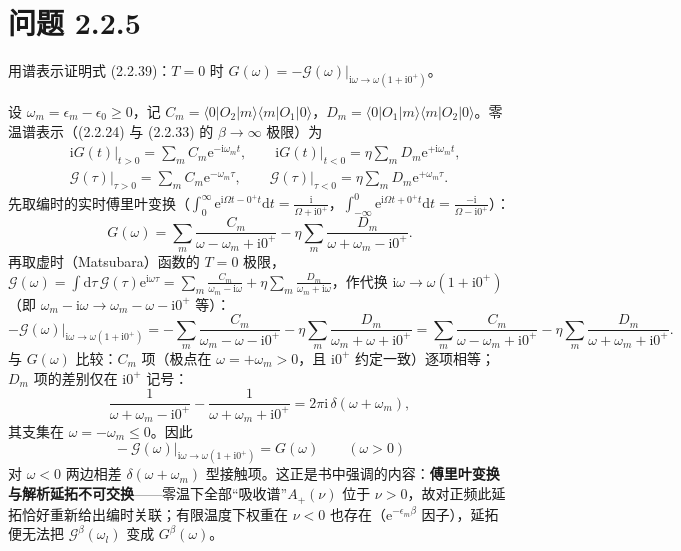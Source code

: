 \section*{问题 2.2.5}
\begin{problem}
用谱表示证明式 (2.2.39)：$T=0$ 时 $G(\omega)=-\mathcal G(\omega)\big|_{\mathrm{i}\omega\to\omega(1+\mathrm{i}0^+)}$。
\end{problem}
\solution
设 $\omega_m=\epsilon_m-\epsilon_0\ge0$，记 $C_m=\langle0|O_2|m\rangle\langle m|O_1|0\rangle$，$D_m=\langle0|O_1|m\rangle\langle m|O_2|0\rangle$。零温谱表示（(2.2.24) 与 (2.2.33) 的 $\beta\to\infty$ 极限）为
\begin{align*}
&\mathrm{i}G(t)\big|_{t>0}=\sum_mC_m\mathrm{e}^{-\mathrm{i}\omega_mt},\qquad
\mathrm{i}G(t)\big|_{t<0}=\eta\sum_mD_m\mathrm{e}^{+\mathrm{i}\omega_mt},\\
&\mathcal G(\tau)\big|_{\tau>0}=\sum_mC_m\mathrm{e}^{-\omega_m\tau},\qquad
\mathcal G(\tau)\big|_{\tau<0}=\eta\sum_mD_m\mathrm{e}^{+\omega_m\tau}.
\end{align*}
先取编时的实时傅里叶变换（$\int_0^\infty\mathrm{e}^{\mathrm{i}\varOmega t-0^+t}\mathrm{d}t=\frac{\mathrm{i}}{\varOmega+\mathrm{i}0^+}$，$\int_{-\infty}^0\mathrm{e}^{\mathrm{i}\varOmega t+0^+t}\mathrm{d}t=\frac{-\mathrm{i}}{\varOmega-\mathrm{i}0^+}$）：
\begin{equation*}
G(\omega)=\sum_m\frac{C_m}{\omega-\omega_m+\mathrm{i}0^+}
-\eta\sum_m\frac{D_m}{\omega+\omega_m-\mathrm{i}0^+}.
\end{equation*}
再取虚时（Matsubara）函数的 $T=0$ 极限，$\mathcal G(\omega)=\int\mathrm{d}\tau\,\mathcal G(\tau)\mathrm{e}^{\mathrm{i}\omega\tau}=\sum_m\frac{C_m}{\omega_m-\mathrm{i}\omega}+\eta\sum_m\frac{D_m}{\omega_m+\mathrm{i}\omega}$，作代换 $\mathrm{i}\omega\to\omega(1+\mathrm{i}0^+)$（即 $\omega_m-\mathrm{i}\omega\to\omega_m-\omega-\mathrm{i}0^+$ 等）：
\begin{equation*}
-\mathcal G(\omega)\big|_{\mathrm{i}\omega\to\omega(1+\mathrm{i}0^+)}
=-\sum_m\frac{C_m}{\omega_m-\omega-\mathrm{i}0^+}
-\eta\sum_m\frac{D_m}{\omega_m+\omega+\mathrm{i}0^+}
=\sum_m\frac{C_m}{\omega-\omega_m+\mathrm{i}0^+}
-\eta\sum_m\frac{D_m}{\omega+\omega_m+\mathrm{i}0^+}.
\end{equation*}
与 $G(\omega)$ 比较：$C_m$ 项（极点在 $\omega=+\omega_m>0$，且 $\mathrm{i}0^+$ 约定一致）逐项相等；$D_m$ 项的差别仅在 $\mathrm{i}0^+$ 记号：
\begin{equation*}
\frac{1}{\omega+\omega_m-\mathrm{i}0^+}-\frac{1}{\omega+\omega_m+\mathrm{i}0^+}=2\pi\mathrm{i}\,\delta(\omega+\omega_m),
\end{equation*}
其支集在 $\omega=-\omega_m\le0$。因此
\begin{equation*}
\boxed{\;-\mathcal G(\omega)\big|_{\mathrm{i}\omega\to\omega(1+\mathrm{i}0^+)}=G(\omega)
\qquad(\omega>0)\;}
\end{equation*}
对 $\omega<0$ 两边相差 $\delta(\omega+\omega_m)$ 型接触项。这正是书中强调的内容：\textbf{傅里叶变换与解析延拓不可交换}——零温下全部“吸收谱”$A_+(\nu)$ 位于 $\nu>0$，故对正频此延拓恰好重新给出编时关联；有限温度下权重在 $\nu<0$ 也存在（$\mathrm{e}^{-\epsilon_m\beta}$ 因子），延拓便无法把 $\mathcal G^\beta(\omega_l)$ 变成 $G^\beta(\omega)$。

